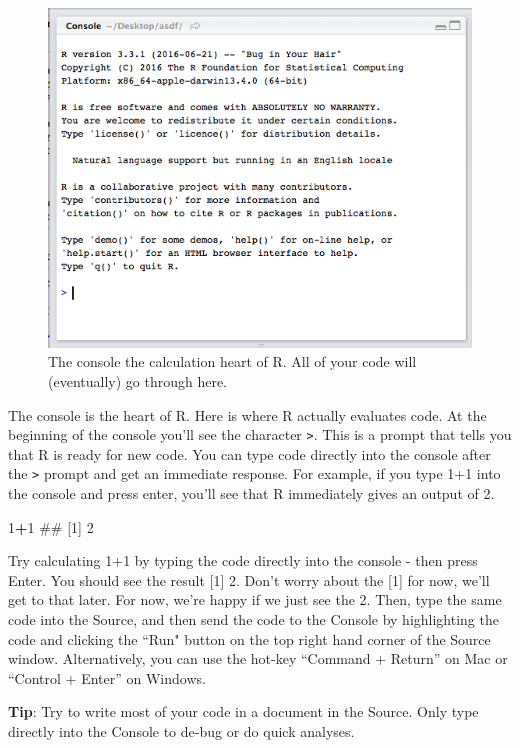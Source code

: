 \documentclass[]{book}
\newenvironment{Shaded}{\begin{snugshade}}{\end{snugshade}}
\newcommand{\DecValTok}[1]{\textcolor[rgb]{0.00,0.00,0.81}{#1}}
\newcommand{\OperatorTok}[1]{\textcolor[rgb]{0.81,0.36,0.00}{\textbf{#1}}}
\newcommand{\NormalTok}[1]{#1}
\theoremstyle{definition}
\theoremstyle{definition}
\theoremstyle{remark}
\begin{document}
\begin{figure}
\includegraphics[width=0.75\linewidth]{images/consoless} \caption{The console the calculation heart of R. All of your code will (eventually) go through here.}\label{fig:consolewindow}
\end{figure}

The console is the heart of R. Here is where R actually evaluates code.
At the beginning of the console you'll see the character \texttt{>}.
This is a prompt that tells you that R is ready for new code. You can
type code directly into the console after the \texttt{>} prompt and get
an immediate response. For example, if you type 1+1 into the console and
press enter, you'll see that R immediately gives an output of 2.

\begin{Shaded}
\begin{Highlighting}[]
\DecValTok{1}\OperatorTok{+}\DecValTok{1}
\NormalTok{## [1] 2}
\end{Highlighting}
\end{Shaded}

Try calculating 1+1 by typing the code directly into the console - then
press Enter. You should see the result {[}1{]} 2. Don't worry about the
{[}1{]} for now, we'll get to that later. For now, we're happy if we
just see the 2. Then, type the same code into the Source, and then send
the code to the Console by highlighting the code and clicking the ``Run"
button on the top right hand corner of the Source window. Alternatively,
you can use the hot-key ``Command + Return'' on Mac or ``Control +
Enter'' on Windows.

\textbf{Tip}: Try to write most of your code in a document in the
Source. Only type directly into the Console to de-bug or do quick
analyses.
\end{document}
